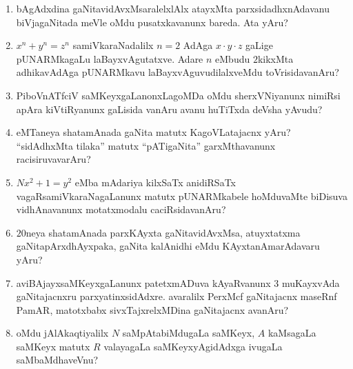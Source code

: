 \begin{enumerate}
\item bAgAdxdina gaNitavidAvxMsaralelxlAlx atayxMta parxsidadhxnAdavanu biVjagaNitada meVle oMdu pusatxkavanunx bareda. Ata yAru?

\item $x^n+y^n=z^n$ samiVkaraNadalilx $n=2$ AdAga $x \cdot y \cdot z$ gaLige pUNARMkagaLu laBayxvAgutatxve. Adare $n$ eMbudu $2$kikxMta adhikavAdAga pUNARMkavu laBayxvAguvudilalxveMdu toVrisidavanAru?

\item PiboVnATfciV saMKeyxgaLanonxLagoMDa oMdu sherxVNiyanunx nimiRsi apAra kiVtiRyanunx gaLisida vanAru avanu huTiTxda deVsha yAvudu?

\item eMTaneya shatamAnada gaNita matutx  KagoVLatajacnx yAru? ``sidAdhxMta tilaka'' matutx ``pATigaNita'' garxMthavanunx racisiruvavarAru?

\item $Nx^2 +1=y^2$ eMba mAdariya kilxSaTx anidiRSaTx vagaRsamiVkaraNagaLanunx matutx pUNARMkabele hoMduvaMte biDisuva vidhAnavanunx motatxmodalu caciRsidavanAru?

\item $20$neya shatamAnada parxKAyxta gaNitavidAvxMsa, atuyxtatxma gaNitapArxdhAyxpaka, gaNita kalAnidhi eMdu KAyxtanAmarAdavaru yAru?

\item aviBAjayxsaMKeyxgaLanunx patetxmADuva kAyaRvanunx $3$ muKayxvAda gaNitajacnxru parxyatinxsidAdxre. avaralilx PerxMcf gaNitajacnx maseRnf PamAR, matotxbabx sivxTajxrelxMDina gaNitajacnx avanAru?

\item oMdu jAlAkaqtiyalilx $N$ saMpAtabiMdugaLa saMKeyx, $A$ kaMsagaLa saMKeyx matutx $R$ valayagaLa saMKeyxyAgidAdxga ivugaLa saMbaMdhaveVnu?
  
\end{enumerate}

